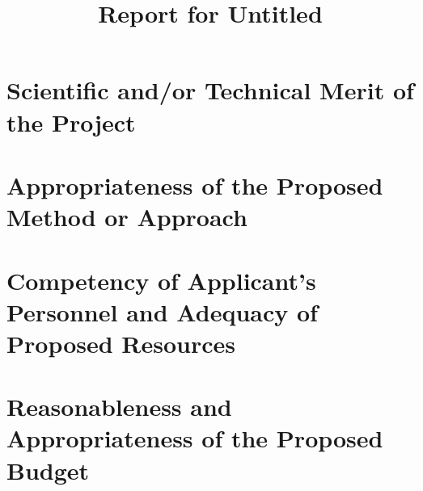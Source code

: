 \documentclass[11pt,a4paper,final]{article}
\title{Report for Untitled}
\date{}
\begin{document}
\maketitle
\section{Scientific and/or Technical Merit of the Project}

\section{Appropriateness of the Proposed Method or Approach}

\section{Competency of Applicant’s Personnel and Adequacy of Proposed Resources}

\section{Reasonableness and Appropriateness of the Proposed Budget}
\end{document}
